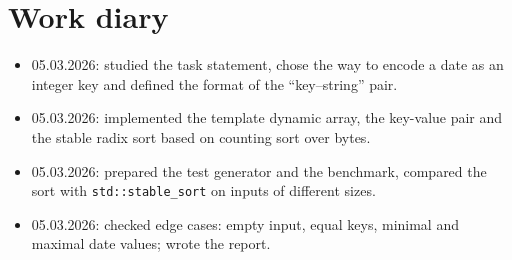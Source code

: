 \section{Work diary}

\begin{itemize}
    \item 05.03.2026: studied the task statement, chose the way to encode a date as an
    integer key and defined the format of the \enquote{key--string} pair.
    \item 05.03.2026: implemented the template dynamic array, the key-value pair and
    the stable radix sort based on counting sort over bytes.
    \item 05.03.2026: prepared the test generator and the benchmark, compared the sort
    with \texttt{std::stable\_sort} on inputs of different sizes.
    \item 05.03.2026: checked edge cases: empty input, equal keys, minimal and maximal
    date values; wrote the report.
\end{itemize}

\pagebreak

